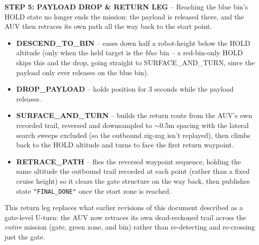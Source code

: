 \documentclass[10.5pt,a4paper]{article}
\begin{document}
\begin{addedbox}
\textbf{STEP 5: PAYLOAD DROP \& RETURN LEG} -- Reaching the blue bin's HOLD state no longer
ends the mission: the payload is released there, and the AUV then retraces its own path all
the way back to the start point.
\begin{itemize}[leftmargin=1.2em,itemsep=1pt,topsep=2pt]
  \item \textbf{DESCEND\_TO\_BIN} -- eases down half a robot-height below the HOLD altitude
    (only when the held target is the \emph{blue} bin -- a red-bin-only HOLD skips this and
    the drop, going straight to SURFACE\_AND\_TURN, since the payload only ever releases on
    the blue bin).
  \item \textbf{DROP\_PAYLOAD} -- holds position for 3 seconds while the payload releases.
  \item \textbf{SURFACE\_AND\_TURN} -- builds the return route from the AUV's own recorded
    trail, reversed and downsampled to $\sim$0.5m spacing with the lateral search sweeps
    excluded (so the outbound zig-zag isn't replayed), then climbs back to the HOLD altitude
    and turns to face the first return waypoint.
  \item \textbf{RETRACE\_PATH} -- flies the reversed waypoint sequence, holding the same
    altitude the outbound trail recorded at each point (rather than a fixed cruise height) so
    it clears the gate structure on the way back, then publishes state \texttt{"FINAL\_DONE"}
    once the start zone is reached.
\end{itemize}
This return leg replaces what earlier revisions of this document described as a gate-level
U-turn: the AUV now retraces its own dead-reckoned trail across the \emph{entire} mission
(gate, green zone, and bin) rather than re-detecting and re-crossing just the gate.
\end{addedbox}
\end{document}

